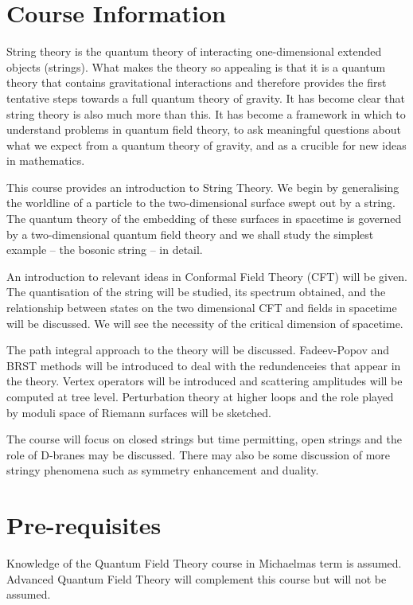 \documentclass[a4paper,11pt]{article}
\begin{document}
	\maketitlepage
	\preliminaries

	\section*{Course Information}
	
	String theory is the quantum theory of interacting one-dimensional extended objects (strings). What makes the theory so appealing is that it is a quantum theory that contains gravitational interactions and therefore provides the first tentative steps towards a full quantum theory of gravity. It has become clear that string theory is also much more than this. It has become a framework in which to understand problems in quantum field theory, to ask meaningful questions about what we expect from a quantum theory of gravity, and as a crucible for new ideas in mathematics.
	
	This course provides an introduction to String Theory. We begin by generalising the worldline of a particle to the two-dimensional surface swept out by a string. The quantum theory of the embedding of these surfaces in spacetime is governed by a two-dimensional quantum field theory and we shall study the simplest example -- the bosonic string -- in detail.
	
	An introduction to relevant ideas in Conformal Field Theory (CFT) will be given. The quantisation of the string will be studied, its spectrum obtained, and the relationship between states on the two dimensional CFT and fields in spacetime will be discussed. We will see the necessity of the critical dimension of spacetime.

	The path integral approach to the theory will be discussed. Fadeev-Popov and BRST methods will be introduced to deal with the redundenceies that appear in the theory. Vertex operators will be introduced and scattering amplitudes will be computed at tree level. Perturbation theory at higher loops and the role played by moduli space of Riemann surfaces will be sketched.

	The course will focus on closed strings but time permitting, open strings and the role of D-branes may be discussed. There may also be some discussion of more stringy phenomena such as symmetry enhancement and duality.

	\section*{Pre-requisites}

	Knowledge of the Quantum Field Theory course in Michaelmas term is assumed. Advanced Quantum Field Theory will complement this course but will not be assumed.
\end{document}
